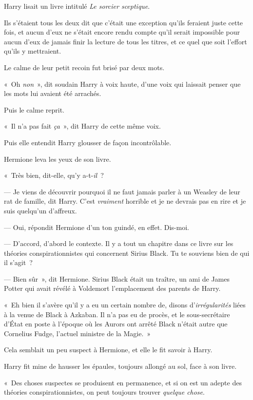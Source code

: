 Harry lisait un livre intitulé \emph{Le sorcier sceptique}.

Ils s'étaient tous les deux dit que c'était une exception qu'ils feraient juste cette fois, et aucun d'eux ne s'était encore rendu compte qu'il serait impossible pour aucun d'eux de jamais finir la lecture de tous les titres, et ce quel que soit l'effort qu'ils y mettraient.

Le calme de leur petit recoin fut brisé par deux mots.

«~Oh \emph{non}~», dit soudain Harry à voix haute, d'une voix qui laissait penser que les mots lui avaient été arrachés.

Puis le calme reprit.

«~Il n'a pas fait \emph{ça}~», dit Harry de cette même voix.

Puis elle entendit Harry glousser de façon incontrôlable.

Hermione leva les yeux de son livre.

«~Très bien, dit-elle, qu'y a-t-\emph{il}~?

--- Je viens de découvrir pourquoi il ne faut jamais parler à un Weasley de leur rat de famille, dit Harry.
C'est \emph{vraiment} horrible et je ne devrais pas en rire et je suis quelqu'un d'affreux.

--- Oui, répondit Hermione d'un ton guindé, en effet.
Dis-moi.

--- D'accord, d'abord le contexte.
Il y a tout un chapitre dans ce livre sur les théories conspirationnistes qui concernent Sirius Black.
Tu te souviens bien de qui il s'agit~?

--- Bien sûr~», dit Hermione.
Sirius Black était un traître, un ami de James Potter qui avait révélé à Voldemort l'emplacement des parents de Harry.

«~Eh bien il s'avère qu'il y a eu un certain nombre de, disons d'\emph{irrégularités} liées à la venue de Black à Azkaban.
Il n'a pas eu de procès, et le sous-secrétaire d'État en poste à l'époque où les Aurors ont arrêté Black n'était autre que Cornelius Fudge, l'actuel ministre de la Magie.~»

Cela semblait un peu suspect à Hermione, et elle le fit savoir à Harry.

Harry fit mine de hausser les épaules, toujours allongé au sol, face à son livre.

«~Des choses suspectes se produisent en permanence, et si on est un adepte des théories conspirationnistes, on peut toujours trouver \emph{quelque chose}.

